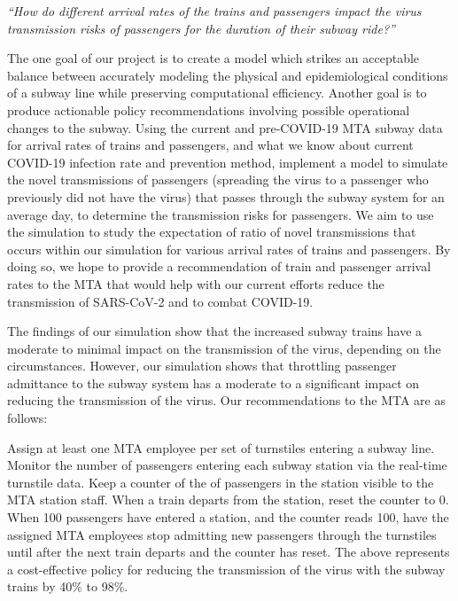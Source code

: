 \documentclass[12pt]{article}
\begin{document}
\begin{displayquote}
\emph{``How do different arrival rates of the trains and passengers impact the virus transmission risks of passengers for the duration of their subway ride?''}
\end{displayquote}

The one goal of our project is to create a model which strikes an acceptable balance between accurately modeling the physical and epidemiological conditions of a subway line while preserving computational efficiency.
Another goal is to produce actionable policy recommendations involving possible operational changes to the subway.
Using the current and pre-COVID-19 MTA subway data for arrival rates of trains and passengers, and what we know about current COVID-19 infection rate and prevention method, implement a model to simulate the novel transmissions of passengers (spreading the virus to a passenger who previously did not have the virus) that passes through the subway system for an average day, to determine the transmission risks for passengers.
We aim to use the simulation to study the expectation of ratio of novel transmissions that occurs within our simulation for various arrival rates of trains and passengers.
By doing so, we hope to provide a recommendation of train and passenger arrival rates to the MTA that would help with our current efforts reduce the transmission of SARS-CoV-2 and to combat COVID-19.

The findings of our simulation show that the increased subway trains have a moderate to minimal impact on the transmission of the virus, depending on the circumstances.
However, our simulation shows that throttling passenger admittance to the subway system has a moderate to a significant impact on reducing the transmission of the virus.
Our recommendations to the MTA are as follows:


\begin{displayquote}
	Assign at least one MTA employee per set of turnstiles entering a subway line.
	Monitor the number of passengers entering each subway station via the real-time turnstile data.
	Keep a counter of the of passengers in the station visible to the MTA station staff.
	When a train departs from the station, reset the counter to 0.
	When 100 passengers have entered a station, and the counter reads 100, have the assigned MTA employees stop admitting new passengers through the turnstiles until after the next train departs and the counter has reset.
	The above represents a cost-effective policy for reducing the transmission of the virus with the subway trains by 40\% to 98\%.
\end{displayquote}
\end{document}
